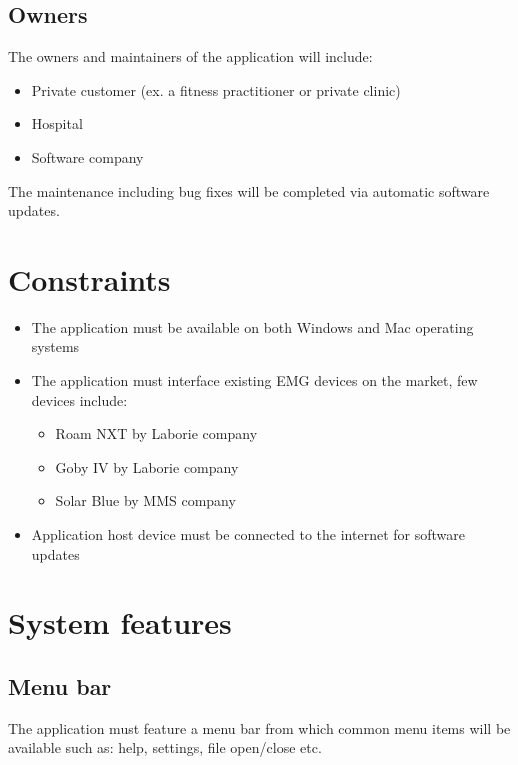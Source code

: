 \documentclass[12pt,a4paper]{article}
\begin{document}
\subsection{Owners}

The owners and maintainers of the application will include:

\begin{itemize}
	\item Private customer (ex. a fitness practitioner or private clinic)
	\item Hospital
	\item Software company
\end{itemize}

The maintenance including bug fixes will be completed via automatic software updates. 

\section{Constraints}

\begin{itemize}
	\item The application must be available on both Windows and Mac operating systems
	\item The application must interface existing EMG devices on the market, few devices include:
	
		\begin{itemize}
			\item Roam NXT by Laborie company
			\item Goby IV by Laborie company
			\item Solar Blue by MMS company
		\end{itemize}

	\item Application host device must be connected to the internet for software updates
\end{itemize}

\newpage

\section{System features}

\subsection{Menu bar}

The application must feature a menu bar from which common menu items will be available such as: help, settings, file open/close etc.
\end{document}
